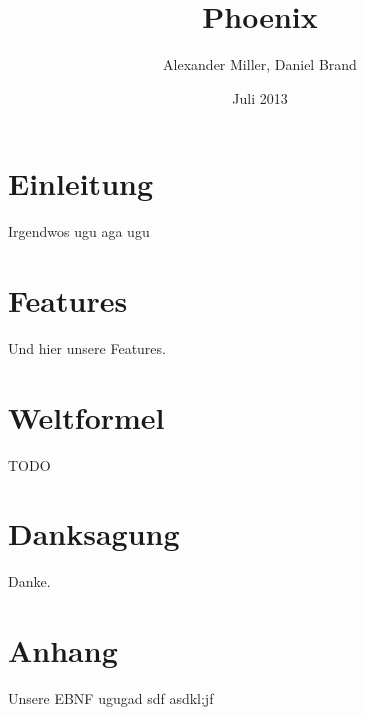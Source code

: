 \documentclass{article}
\title{Phoenix}
\author{Alexander Miller, Daniel Brand}
\date{Juli 2013}
\begin{document}
	\maketitle
	\newpage
	\tableofcontents
	\newpage

	\section{Einleitung}
	Irgendwos ugu aga ugu

	\section{Features}
	Und hier unsere Features.

	\section{Weltformel}
	TODO

	\section{Danksagung}
	Danke.

	\section{Anhang}
	Unsere EBNF ugugad sdf asdkl;jf 
\end{document}
